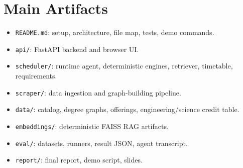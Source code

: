 \documentclass[10pt,letterpaper]{article}
\newcommand{\code}[1]{\texttt{#1}}
\begin{document}
\section{Main Artifacts}
\begin{itemize}
  \item \code{README.md}: setup, architecture, file map, tests, demo commands.
  \item \code{api/}: FastAPI backend and browser UI.
  \item \code{scheduler/}: runtime agent, deterministic engines, retriever, timetable, requirements.
  \item \code{scraper/}: data ingestion and graph-building pipeline.
  \item \code{data/}: catalog, degree graphs, offerings, engineering/science credit table.
  \item \code{embeddings/}: deterministic FAISS RAG artifacts.
  \item \code{eval/}: datasets, runners, result JSON, agent transcript.
  \item \code{report/}: final report, demo script, slides.
\end{itemize}
\end{document}
